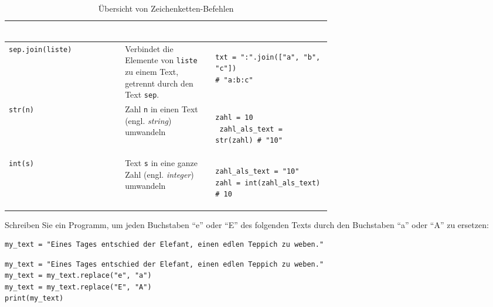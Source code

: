 \begin{table}[H]
\begin{longtable}{lm{0.28\linewidth}m{0.36\linewidth}}
\begin{lstlisting}[numbers=none]
\end{lstlisting}                                   \\\midrule
        \lstinline|sep.join(liste)|        & Verbindet die Elemente von \texttt{liste} zu einem Text, getrennt durch den Text \texttt{sep}.                                                 & \begin{lstlisting}[numbers=none]
txt = ":".join(["a", "b", "c"])
# "a:b:c"
\end{lstlisting}                                   \\\midrule
        \lstinline|str(n)|                 & Zahl \texttt{n} in einen Text (engl. \textit{string}) umwandeln                                                                                & \begin{lstlisting}[numbers=none]
 zahl = 10
 zahl_als_text = str(zahl) # "10"
\end{lstlisting}                                   \\\midrule
        \lstinline|int(s)|                 & Text \texttt{s} in eine ganze Zahl (engl. \textit{integer}) umwandeln                                                                          & \begin{lstlisting}[numbers=none]
zahl_als_text = "10"
zahl = int(zahl_als_text) # 10
\end{lstlisting}
    \end{longtable}
    \caption{Übersicht von Zeichenketten-Befehlen}
    \label{tab:string-op}
\end{table}
\begin{myexercise}
    Schreiben Sie ein Programm, um jeden Buchstaben \enquote{e} oder \enquote{E} des folgenden Texts durch den Buchstaben \enquote{a} oder \enquote{A} zu ersetzen:

    \begin{lstlisting}
my_text = "Eines Tages entschied der Elefant, einen edlen Teppich zu weben."
\end{lstlisting}

    \begin{myanswer}
        \begin{lstlisting}
my_text = "Eines Tages entschied der Elefant, einen edlen Teppich zu weben."
my_text = my_text.replace("e", "a")
my_text = my_text.replace("E", "A")
print(my_text)
\end{lstlisting}
    \end{myanswer}
\end{myexercise}


